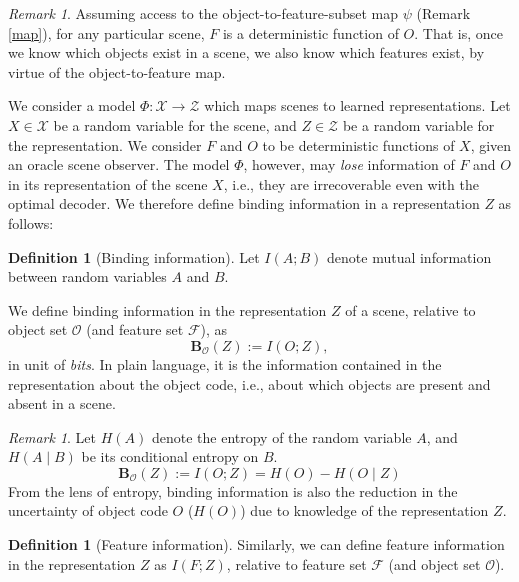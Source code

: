 \documentclass{article}
\theoremstyle{plain}
\theoremstyle{definition}
\newtheorem{definition}[theorem]{Definition}
\theoremstyle{remark}
\newtheorem{remark}[theorem]{Remark}
\begin{document}
\begin{remark}
    Assuming access to the object-to-feature-subset map $\psi$ (Remark \ref{map}), for any particular scene, $F$ is a deterministic function of $O$. That is, once we know which objects exist in a scene, we also know which features exist, by virtue of the object-to-feature map.\label{deter}
\end{remark}

We consider a model \(\Phi : \mathcal{X} \to \mathcal{Z}\) which maps scenes to learned representations. Let \(X\in \mathcal{X} \) be a random variable for the scene, and $Z \in \mathcal{Z}$ be a random variable for the representation. We consider $F$ and $O$ to be deterministic functions of $X$, given an oracle scene observer. The model $\Phi$, however, may \textit{lose} information of $F$ and $O$ in its representation of the scene $X$, i.e., they are irrecoverable even with the optimal decoder. We therefore define binding information in a representation $Z$ as follows:

\begin{definition}[Binding information]
Let $I(A;B)$ denote mutual information between random variables $A$ and $B$. 

    We define binding information in the representation $Z$ of a scene, relative to object set $\mathcal{O}$ (and feature set $\mathcal{F}$), as
    \[
    \mathbf{B}_{\mathcal{O}}(Z):= I(O;Z),
    \]
    in unit of \textit{bits}. In plain language, it is the information contained in the representation about the object code, i.e., about which objects are present and absent in a scene.
    \label{bindinfo}
\end{definition}

\begin{remark} Let $H(A)$ denote the entropy of the random variable $A$, and $H(A\mid B)$ be its conditional entropy on $B$.
    \begin{equation}
        \mathbf{B}_{\mathcal{O}}(Z):= I(O;Z)=H(O)-H(O\mid Z)\label{entropydef}
    \end{equation}
    From the lens of entropy, binding information is also the reduction in the uncertainty of object code $O$ ($H(O)$) due to knowledge of the representation $Z$.
\end{remark}

\begin{definition}[Feature information] Similarly, we can define feature information in the representation $Z$ as $I(F;Z)$, relative to feature set $\mathcal{F}$ (and object set $\mathcal{O}$).
\end{definition}
\end{document}
